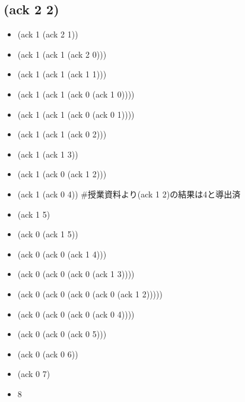 \documentclass[a4paper,12pt]{article}
\begin{document}
\subsection{(ack 2 2)}
\begin{itemize}
    \item (ack 1 (ack 2 1))
    \item (ack 1 (ack 1 (ack 2 0)))
    \item (ack 1 (ack 1 (ack 1 1)))
    \item (ack 1 (ack 1 (ack 0 (ack 1 0))))
    \item (ack 1 (ack 1 (ack 0 (ack 0 1))))
    \item (ack 1 (ack 1 (ack 0 2)))
    \item (ack 1 (ack 1 3))
    \item (ack 1 (ack 0 (ack 1 2)))
    \item (ack 1 (ack 0 4)) \#授業資料より(ack 1 2)の結果は4と導出済
    \item (ack 1 5)
    \item (ack 0 (ack 1 5))
    \item (ack 0 (ack 0 (ack 1 4)))
    \item (ack 0 (ack 0 (ack 0 (ack 1 3))))
    \item (ack 0 (ack 0 (ack 0 (ack 0 (ack 1 2)))))
    \item (ack 0 (ack 0 (ack 0 (ack 0 4))))
    \item (ack 0 (ack 0 (ack 0 5)))
    \item (ack 0 (ack 0 6))
    \item (ack 0 7)
    \item 8
\end{itemize}
\end{document}
